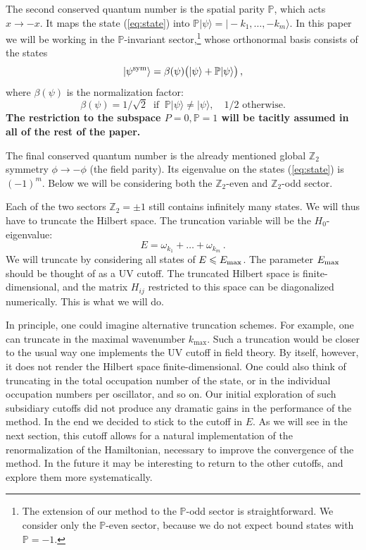 \documentclass[11pt]{article}
\newcommand{\reef}[1]{(\ref{#1})}
\newcommand{\beq}{\begin{equation}}
\newcommand{\eeq}{\end{equation}}
\def\bZ {\mathbb{Z}}
\def\bZ {\mathbb{Z}}
\def\bP {\mathbb{P}}
\def\le{\leqslant}
\newcommand{\ket}[1]{|#1\rangle}
\def \Emax{E_{\rm max}}
\numberwithin{equation}{section}
\begin{document}
The second conserved quantum number is the spatial parity $\bP$, which acts $x\to -x$. It maps the state \reef{eq:state} into 
$\bP\ket{\psi}=\ket{-k_1,\ldots,-k_m}$. In this paper we will be working in the $\bP$-invariant sector,\footnote{The extension of our method to the $\bP$-odd sector is straightforward. We consider only the $\bP$-even sector, because we do not expect bound states with $\bP=-1$.} whose orthonormal basis consists of the states
\beq
\label{eq:symm}
\ket{\psi^{\rm sym}}=\beta(\psi)\bigl(\ket{\psi}+\bP\ket{\psi}\bigr)\,,
\eeq
where $\beta(\psi)$ is the normalization factor: 
 \beq
\beta(\psi)=
1/\sqrt{2}\ \text{  if  }\ \bP\ket{\psi}\ne \ket{\psi},\quad
1/2 \text{  otherwise}.
 \eeq
{\bf The restriction to the subspace $P=0, \bP=1$ will be tacitly assumed in all of the rest of the paper.}  
 
The final conserved quantum number is the already mentioned global $\bZ_2$ symmetry $\phi\to -\phi$ (the field parity). Its eigenvalue on the states \reef{eq:state} is $(-1)^m$. Below we will be considering both the $\bZ_2$-even and $\bZ_2$-odd sector. %

Each of the two sectors $\bZ_2=\pm 1$ still contains infinitely many states. We will thus have to truncate the Hilbert space. 
The truncation variable will be the $H_0$-eigenvalue:
\beq
E=\omega_{k_{1}} + \dots + \omega_{k_{m}}\,.
\eeq
We will truncate by considering all states of $E\le\Emax$. The parameter $\Emax$ should be thought of as a UV cutoff. The truncated Hilbert space is finite-dimensional, and the matrix $H_{ij}$ restricted to this space can be diagonalized numerically. This is what we will do.

In principle, one could imagine alternative truncation schemes.
For example, one can truncate in the maximal wavenumber $k_{\max}$. Such a truncation would be closer to the usual way one implements the UV cutoff in field theory. By itself, however, it does not render the Hilbert space finite-dimensional. One could also think of truncating in the total occupation number of the state, or in the individual occupation numbers per oscillator, and so on. Our initial exploration of such subsidiary cutoffs did not produce any dramatic gains in the performance of the method. In the end we decided to stick to the cutoff in $E$. As we will see in the next section, this cutoff allows for a natural implementation of the renormalization of the Hamiltonian, necessary to improve the convergence of the method. In the future it may be interesting to return to the other cutoffs, and explore them more systematically. 
\end{document}
